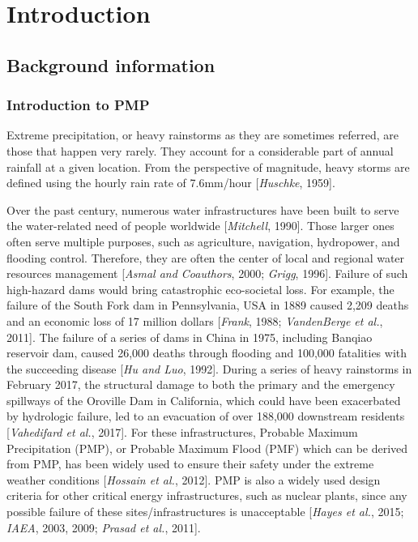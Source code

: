 \chapter {Introduction}
\label{ch:intro}

\section {Background information}

\subsection{Introduction to PMP}

Extreme precipitation, or heavy rainstorms as they are sometimes referred, are those that happen very rarely. They account for a considerable part of annual rainfall at a given location. From the perspective of magnitude, heavy storms are defined using the hourly rain rate of 7.6mm/hour [\textit{Huschke}, 1959].

Over the past century, numerous water infrastructures have been built to serve the water-related need of people worldwide [\textit{Mitchell}, 1990]. Those larger ones often serve multiple purposes, such as agriculture, navigation, hydropower, and flooding control. Therefore, they are often the center of local and regional water resources management [\textit{Asmal and Coauthors}, 2000; \textit{Grigg}, 1996]. Failure of such high-hazard dams would bring catastrophic eco-societal loss. For example, the failure of the South Fork dam in Pennsylvania, USA in 1889 caused 2,209 deaths and an economic loss of 17 million dollars [\textit{Frank}, 1988; \textit{VandenBerge et al.}, 2011].  The failure of a series of dams in China in 1975, including Banqiao reservoir dam, caused 26,000 deaths through flooding and 100,000 fatalities with the succeeding disease [\textit{Hu and Luo}, 1992]. During a series of heavy rainstorms in February 2017, the structural damage to both the primary and the emergency spillways of the Oroville Dam in California, which could have been exacerbated by hydrologic failure, led to an evacuation of over 188,000 downstream residents [\textit{Vahedifard et al.}, 2017]. For these infrastructures, Probable Maximum Precipitation (PMP), or Probable Maximum Flood (PMF) which can be derived from PMP,  has been widely used to ensure their safety under the extreme weather conditions [\textit{Hossain et al.}, 2012]. PMP is also a widely used design criteria for other critical energy infrastructures, such as nuclear plants, since any possible failure of these sites/infrastructures is unacceptable [\textit{Hayes et al.}, 2015; \textit{IAEA}, 2003, 2009; \textit{Prasad et al.}, 2011].

